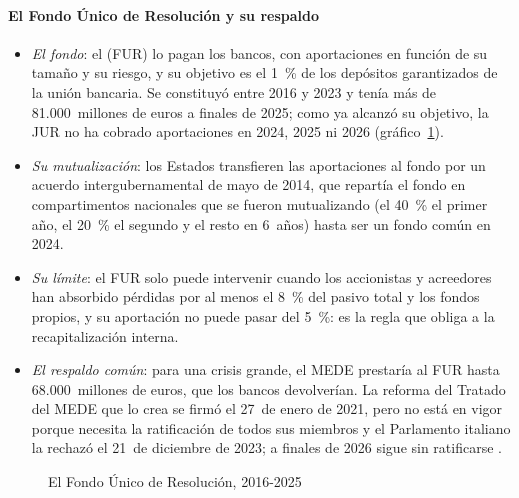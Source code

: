 \documentclass[11pt]{article}
\begin{document}
\paragraph{El Fondo Único de Resolución y su respaldo}

\begin{itemize}
\item \emph{El fondo}: el  (FUR) lo pagan los bancos, con aportaciones en función de su tamaño y su riesgo, y su objetivo es el 1~\% de los depósitos garantizados de la unión bancaria. Se constituyó entre 2016 y 2023 y tenía más de 81.000~millones de euros a finales de 2025; como ya alcanzó su objetivo, la JUR no ha cobrado aportaciones en 2024, 2025 ni 2026 (gráfico~\ref{fig:fur})\nocite{SRB2026FUR,SRB2026SinAportaciones}.
\item \emph{Su mutualización}: los Estados transfieren las aportaciones al fondo por un acuerdo intergubernamental de mayo de 2014, que repartía el fondo en compartimentos nacionales que se fueron mutualizando (el 40~\% el primer año, el 20~\% el segundo y el resto en 6~años) hasta ser un fondo común en 2024\nocite{Consejo2014AcuerdoFUR}.
\item \emph{Su límite}: el FUR solo puede intervenir cuando los accionistas y acreedores han absorbido pérdidas por al menos el 8~\% del pasivo total y los fondos propios, y su aportación no puede pasar del 5~\%: es la regla que obliga a la recapitalización interna.
\item \emph{El respaldo común}: para una crisis grande, el MEDE prestaría al FUR hasta 68.000~millones de euros, que los bancos devolverían. La reforma del Tratado del MEDE que lo crea se firmó el 27~de enero de 2021, pero no está en vigor porque necesita la ratificación de todos sus miembros y el Parlamento italiano la rechazó el 21~de diciembre de 2023; a finales de 2026 sigue sin ratificarse\nocite{Eurogrupo2021MEDE,MEDE2026InformeAnual} .
\end{itemize}

\begin{figure}[H]
\centering
\caption{El Fondo Único de Resolución, 2016-2025}\label{fig:fur}
\end{figure}
\end{document}
